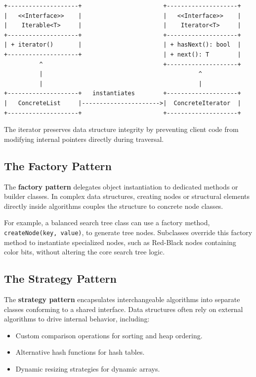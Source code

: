 \documentclass[12pt]{report}
\begin{document}
\begin{verbatim}
+--------------------+                       +--------------------+
|   <<Interface>>    |                       |   <<Interface>>    |
|    Iterable<T>     |                       |    Iterator<T>     |
+--------------------+                       +--------------------+
| + iterator()       |                       | + hasNext(): bool  |
+--------------------+                       | + next(): T        |
          ^                                  +--------------------+
          |                                            ^
          |                                            |
+--------------------+   instantiates        +--------------------+
|   ConcreteList     |---------------------->|  ConcreteIterator  |
+--------------------+                       +--------------------+
\end{verbatim}

The iterator preserves data structure integrity by preventing client code from modifying internal pointers directly during traversal.

\subsection{The Factory Pattern}

The \textbf{factory pattern} delegates object instantiation to dedicated methods or builder classes. In complex data structures, creating nodes or structural elements directly inside algorithms couples the structure to concrete node classes.

For example, a balanced search tree class can use a factory method, \texttt{createNode(key, value)}, to generate tree nodes. Subclasses override this factory method to instantiate specialized nodes, such as Red-Black nodes containing color bits, without altering the core search tree logic.

\subsection{The Strategy Pattern}

The \textbf{strategy pattern} encapsulates interchangeable algorithms into separate classes conforming to a shared interface. Data structures often rely on external algorithms to drive internal behavior, including:

\begin{itemize}
    \item Custom comparison operations for sorting and heap ordering.
    \item Alternative hash functions for hash tables.
    \item Dynamic resizing strategies for dynamic arrays.
\end{itemize}
\end{document}
